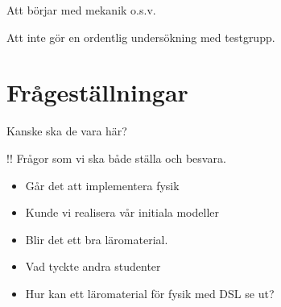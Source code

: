 \begin{binge}

Att börjar med mekanik o.s.v.

Att inte gör en ordentlig undersökning med testgrupp.

\end{binge}

\section{Frågeställningar}

\begin{binge}

Kanske ska de vara här?

!! Frågor som vi ska både ställa och besvara.
\begin{itemize}
  \item Går det att implementera fysik
  \item Kunde vi realisera vår initiala modeller
  \item Blir det ett bra läromaterial.
  \item Vad tyckte andra studenter
  \item Hur kan ett läromaterial för fysik med DSL se ut?
\end{itemize}

\end{binge}

